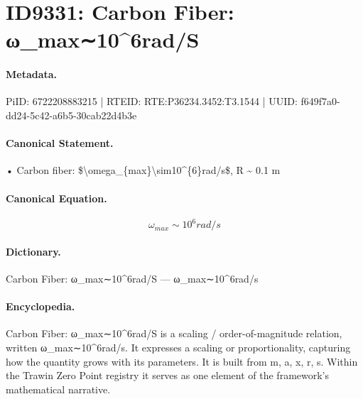 \section*{ID9331: Carbon Fiber: ω\_max∼10\textasciicircum{}6rad/S}
\paragraph{Metadata.}
PiID: 6722208883215 | RTEID: RTE:P36234.3452:T3.1544 | UUID: f649f7a0-dd24-5c42-a6b5-30cab22d4b3e

\paragraph{Canonical Statement.}
• Carbon fiber: \$\textbackslash{}omega\_\{max\}\textbackslash{}sim10\textasciicircum{}\{6\}rad/s\$, R \textasciitilde{} 0.1 m

\paragraph{Canonical Equation.}
\[
\omega_{max}\sim10^{6}rad/s
\]

\paragraph{Dictionary.}
Carbon Fiber: ω\_max∼10\textasciicircum{}6rad/S — ω\_max∼10\textasciicircum{}6rad/s

\paragraph{Encyclopedia.}
Carbon Fiber: ω\_max∼10\textasciicircum{}6rad/S is a scaling / order-of-magnitude relation, written ω\_max∼10\textasciicircum{}6rad/s. It expresses a scaling or proportionality, capturing how the quantity grows with its parameters. It is built from m, a, x, r, s. Within the Trawin Zero Point registry it serves as one element of the framework's mathematical narrative.
